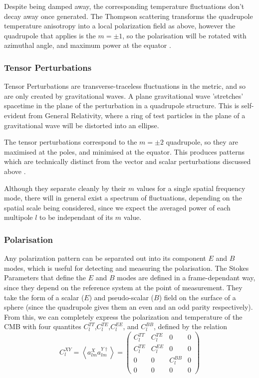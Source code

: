 {Despite being damped away, the corresponding temperature fluctuations don't decay away once generated. The Thompson scattering transforms the quadrupole temperature anisotropy into a local polarization field as above, however the quadrupole that applies is the $m=\pm 1$, so the polarisation will be rotated with azimuthal angle, and maximum power at the equator \cite{Hu:Polarisation}.

\subsubsection{Tensor Perturbations}
Tensor Perturbations are transverse-traceless fluctuations in the metric, and so are only created by gravitational waves. A plane gravitational wave 'str\-etch\-es' spacetime in the plane of the perturbation in a quadrupole structure. This is self- evident from General Relativity, where a ring of test particles in the plane of a gravitational wave will be distorted into an ellipse.

The tensor perturbations correspond to the $m=\pm 2$ quadrupole, so they are maximised at the poles, and minimised at the equator. This produces patterns which are technically distinct from the vector and scalar perturbations discussed above \cite{Hu:Polarisation}.

\par Although they separate cleanly by their $m$ values for a single spatial frequency mode, there will in general exist a spectrum of fluctuations, depending on the spatial scale being considered, since we expect the averaged power of each multipole $l$ to be independant of its $m$ value.

\subsubsection{Polarisation}
Any polarization pattern can be separated out into its component $E$ and $B$ modes, which is useful for detecting and measuring the polarisation. The Stokes Parameters that define the $E$ and $B$ modes are defined in a frame-dependant way, since they depend on the reference system at the point of measurement. They take the form of a scalar ($E$) and pseudo-scalar ($B$) field on the surface of a sphere (since the quadrupole gives them an even and an odd parity respectively). From this, we can completely express the polarization and temperature of the CMB with four quantites $C_l^{TT}$,$C_l^{TE}$,$C_l^{EE}$, and $C_l^{BB}$, defined by the relation
\begin{equation} \label{eq:cmb_plr_tmp}
	C_l^{XY} = \left< a_{lm}^X a_{lm}^{Y\dagger} \right> = \begin{pmatrix}
		C_l^{TT} & C_l^{TE} & 0        & 0 \\
		C_l^{TE} & C_l^{EE} & 0        & 0 \\
		0        & 0        & C_l^{BB} & 0 \\
		0        & 0        & 0        & 0 
	\end{pmatrix}
\end{equation}

}
